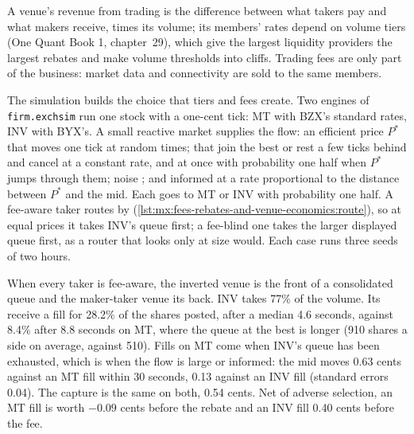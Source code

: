 A venue's revenue from trading is the difference between what takers pay and what makers receive, times its volume; its members' rates depend on
volume tiers (One Quant Book 1, chapter~29), which give the largest liquidity providers the largest rebates and make volume thresholds into cliffs.
Trading fees are only part of the business: market data and connectivity are sold to the same members.

The simulation builds the choice that tiers and fees create. Two engines of \texttt{firm.exchsim} run one stock with a one-cent tick: MT with BZX's
standard rates, INV with BYX's. A small reactive market supplies the flow: an efficient price $P^\ast$ that moves one tick at random times;  that join the best or rest a few ticks behind and cancel at a constant rate, and at once with probability one half when $P^\ast$ jumps through
them; noise ; and informed  at a rate proportional to the distance between $P^\ast$ and the mid. Each  goes to MT
or INV with probability one half. A fee-aware taker routes by  (\cref{lst:mx:fees-rebates-and-venue-economics:route}), so at equal
prices it takes INV's queue first; a fee-blind one takes the larger displayed queue first, as a router that looks only at size would. Each case runs
three seeds of two hours.

\label{lst:mx:fees-rebates-and-venue-economics:takers}

When every taker is fee-aware, the inverted venue is the front of a consolidated queue and the maker-taker venue its back. INV takes 77\% of the
volume. Its  receive a fill for 28.2\% of the shares posted, after a median 4.6 seconds, against 8.4\% after 8.8 seconds on MT, where the
queue at the best is longer (910 shares a side on average, against 510). Fills on MT come when INV's queue has been exhausted, which is when the flow is
large or informed: the mid moves 0.63 cents against an MT fill within 30 seconds, 0.13 against an INV fill (standard errors 0.04). The capture is the same
on both, 0.54 cents. Net of adverse selection, an MT fill is worth $-0.09$ cents before the rebate and an INV fill 0.40 cents before the fee.

